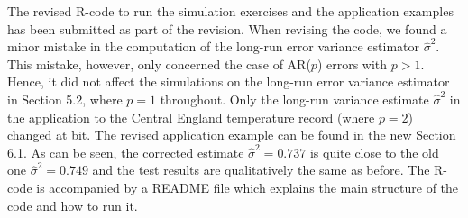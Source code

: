 \documentclass[a4paper,12pt]{article}
\begin{document}
The revised R-code to run the simulation exercises and the application examples has been submitted as part of the revision. When revising the code, we found a minor mistake in the computation of the long-run error variance estimator $\widehat{\sigma}^2$. This mistake, however, only concerned the case of AR($p$) errors with $p > 1$. Hence, it did not affect the simulations on the long-run error variance estimator in Section 5.2, where $p=1$ throughout. Only the long-run variance estimate $\widehat{\sigma}^2$ in the application to the Central England temperature record (where $p=2$) changed at bit. The revised application example can be found in the new Section 6.1. As can be seen, the corrected estimate $\widehat{\sigma}^2 = 0.737$ is quite close to the old one $\widehat{\sigma}^2 = 0.749$ and the test results are qualitatively the same as before. The R-code is accompanied by a README file which explains the main structure of the code and how to run it.  





\end{document}
